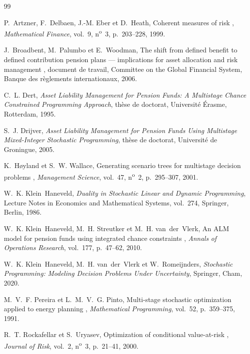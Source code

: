 \documentclass[11pt,letterpaper]{article}
\theoremstyle{definition}
\begin{document}
\begin{thebibliography}{99}

P.~Artzner, F.~Delbaen, J.-M. Eber et D.~Heath,
\og Coherent measures of risk \fg,
\emph{Mathematical Finance}, vol.~9, n\textsuperscript{o}~3, p.~203--228, 1999.

J.~Broadbent, M.~Palumbo et E.~Woodman,
\og The shift from defined benefit to defined contribution pension plans ---
implications for asset allocation and risk management \fg,
document de travail, Committee on the Global Financial System, Banque des
règlements internationaux, 2006.

C.~L. Dert,
\emph{Asset Liability Management for Pension Funds: A Multistage Chance
Constrained Programming Approach},
thèse de doctorat, Université Érasme, Rotterdam, 1995.

S.~J. Drijver,
\emph{Asset Liability Management for Pension Funds Using Multistage
Mixed-Integer Stochastic Programming},
thèse de doctorat, Université de Groningue, 2005.

K.~Høyland et S.~W. Wallace,
\og Generating scenario trees for multistage decision problems \fg,
\emph{Management Science}, vol.~47, n\textsuperscript{o}~2, p.~295--307, 2001.

W.~K. Klein~Haneveld,
\emph{Duality in Stochastic Linear and Dynamic Programming},
Lecture Notes in Economics and Mathematical Systems, vol.~274,
Springer, Berlin, 1986.

W.~K. Klein~Haneveld, M.~H. Streutker et M.~H. van~der~Vlerk,
\og An ALM model for pension funds using integrated chance constraints \fg,
\emph{Annals of Operations Research}, vol.~177, p.~47--62, 2010.

W.~K. Klein~Haneveld, M.~H. van~der~Vlerk et W.~Romeijnders,
\emph{Stochastic Programming: Modeling Decision Problems Under Uncertainty},
Springer, Cham, 2020.

M.~V.~F. Pereira et L.~M.~V.~G. Pinto,
\og Multi-stage stochastic optimization applied to energy planning \fg,
\emph{Mathematical Programming}, vol.~52, p.~359--375, 1991.

R.~T. Rockafellar et S.~Uryasev,
\og Optimization of conditional value-at-risk \fg,
\emph{Journal of Risk}, vol.~2, n\textsuperscript{o}~3, p.~21--41, 2000.


\end{thebibliography}
\end{document}
